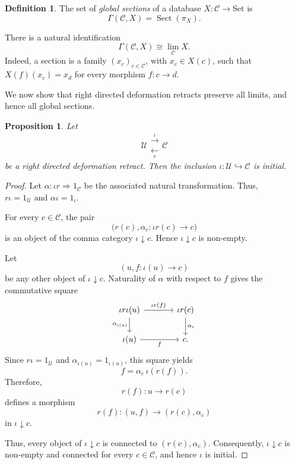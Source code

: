 \documentclass[12pt]{amsart}
\newtheorem{proposition}[teo]{Proposition}
\theoremstyle{definition}
\newtheorem{definition}[teo]{Definition}
\theoremstyle{remark}
\numberwithin{figure}{section}%
\newcommand{\CC}{\mathcal{C}}
\newcommand{\Sets}{\mathrm{Set}}
\newcommand{\Uc}{\mathcal{U}}
\begin{document}
\begin{definition}\label{def:global_sections_database}
The set of \emph{global sections} of a database
\(X\colon\CC\to\Sets\) is
\[
\Gamma(\CC,X)
=
\operatorname{Sect}(\pi_X).
\]
\end{definition}

There is a natural identification
\[
\Gamma(\CC,X)\cong\lim_\CC X.
\]
Indeed, a section is a family \((x_c)_{c\in\CC}\), with
\(x_c\in X(c)\), such that
\(
X(f)(x_c)=x_d
\)
for every morphism \(f\colon c\to d\).

We now show that right directed deformation retracts preserve all limits,
and hence all global sections.

\begin{proposition}\label{prop:directed_retract_initial}
Let
\[
\Uc
\mathrel{\substack{\xrightarrow{\iota}\\[-1mm]\xleftarrow[r]{}}}
\CC
\]
be a right directed deformation retract. Then the inclusion
\(
\iota\colon\Uc\hookrightarrow\CC
\)
is initial.
\end{proposition}

\begin{proof}
Let
\(
\alpha\colon\iota r\Rightarrow1_\CC
\)
be the associated natural transformation. Thus,
\(
r\iota=1_\Uc
\text{ and }
\alpha\iota=1_\iota.
\)

For every \(c\in\CC\), the pair
\[
\bigl(r(c),\alpha_c\colon\iota r(c)\to c\bigr)
\]
is an object of the comma category \(\iota\downarrow c\). Hence
\(\iota\downarrow c\) is non-empty.

Let
\[
(u,f\colon\iota(u)\to c)
\]
be any other object of \(\iota\downarrow c\). Naturality of \(\alpha\)
with respect to \(f\) gives the commutative square
\[
\begin{tikzcd}[column sep=large]
\iota r\iota(u)
  \arrow[r, "\iota r(f)"]
  \arrow[d, "\alpha_{\iota(u)}"']
&
\iota r(c)
  \arrow[d, "\alpha_c"]
\\
\iota(u)
  \arrow[r, "f"']
&
c.
\end{tikzcd}
\]
Since \(r\iota=1_\Uc\) and
\(\alpha_{\iota(u)}=1_{\iota(u)}\), this square yields
\[
f=\alpha_c\,\iota(r(f)).
\]
Therefore,
\[
r(f)\colon u\longrightarrow r(c)
\]
defines a morphism
\[
r(f)\colon
(u,f)
\longrightarrow
(r(c),\alpha_c)
\]
in \(\iota\downarrow c\).

Thus, every object of \(\iota\downarrow c\) is connected to
\((r(c),\alpha_c)\). Consequently, \(\iota\downarrow c\) is non-empty
and connected for every \(c\in\CC\), and hence \(\iota\) is initial.
\end{proof}
\end{document}
